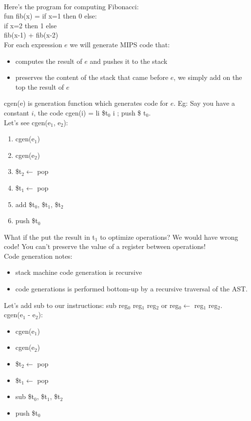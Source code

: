 \documentclass[12pt]{article}
\begin{document}
\\ Here's the program for computing Fibonacci: 
\\ \hspace{2mm} fun fib(x) = if x=1 then 0 else:
\\ \hspace{2mm} if x=2 then 1 else 
\\ \hspace{2mm} fib(x-1) + fib(x-2)
\vspace{3mm}
\\ For each expression $e$ we will generate MIPS code that: 
\begin{itemize}
    \item computes the result of $e$ and pushes it to the stack
    \item preserves the content of the stack that came before $e$, we simply add on the top the result of $e$
\end{itemize}
cgen(e) is generation function which generates code for $e$. Eg: Say you have a constant $i$, the code cgen(i) = li \$t$_0$ i ; push \$ t$_0$.
\\ Let's see cgen(e$_1$, e$_2$): 
\begin{enumerate}
    \item cgen(e$_1$)
    \item cgen(e$_2$)
    \item \$t$_2 \leftarrow$ pop
    \item \$t$_1 \leftarrow$ pop
    \item add \$t$_0$, \$t$_1$, \$t$_2$
    \item push \$t$_0$
\end{enumerate}
What if the put the result in t$_1$ to optimize operations? We would have wrong code! You can't preserve the value of a register between operations!
\\ Code generation notes: 
\begin{itemize}
    \item stack machine code generation is recursive 
    \item code generations is performed bottom-up by a recursive traversal of the AST.
\end{itemize}
Let's add sub to our instructions: sub reg$_0$ reg$_1$ reg$_2$ or reg$_0 \leftarrow$ reg$_1$ reg$_2$.
\\ cgen(e$_1$ - e$_2$):
\begin{itemize}
    \item cgen(e$_1$) 
    \item cgen(e$_2$)
    \item \$t$_2 \leftarrow$ pop 
    \item \$t$_1 \leftarrow$ pop 
    \item sub \$t$_0$, \$t$_1$, \$t$_2$ 
    \item push \$t$_0$
\end{itemize}
\end{document}
